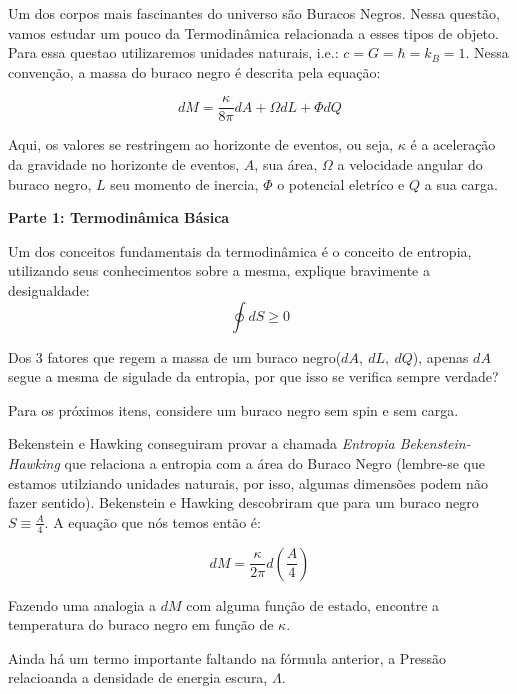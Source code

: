 \documentclass[11pt]{article}
\begin{document}
\begin{pproblem}
    Um dos corpos mais fascinantes do universo são Buracos Negros. Nessa questão, vamos estudar um pouco da Termodinâmica relacionada a esses tipos de objeto. Para essa questao utilizaremos unidades naturais, i.e.: \(c = G = \hbar = k_B = 1\). Nessa convenção, a massa do buraco negro é descrita pela equação:

    \[dM = \frac{\kappa}{8\pi}dA + \Omega dL + \Phi dQ\]

    Aqui, os valores se restringem ao horizonte de eventos, ou seja, \(\kappa\) é a aceleração da gravidade no horizonte de eventos, \(A\), sua área, \(\Omega\) a velocidade angular do buraco negro, \(L\) seu momento de inercia, \(\Phi\) o potencial eletríco e \(Q\) a sua carga.

    \begin{center}
    \textbf{Parte 1: Termodinâmica Básica}   
    \end{center}
    
    \begin{alternativas}
        \item Um dos conceitos fundamentais da termodinâmica é o conceito de entropia, utilizando seus conhecimentos sobre a mesma, explique bravimente a desigualdade:
        \[\oint dS \geq 0\]

        \item Dos 3 fatores que regem a massa de um buraco negro(\(dA, \ dL, \ dQ\)), apenas \(dA\) segue a mesma de sigulade da entropia, por que isso se verifica sempre verdade?
        
        Para os próximos itens, considere um buraco negro sem spin e sem carga.

        \item Bekenstein e Hawking conseguiram provar a chamada \textit{Entropia Bekenstein-Hawking} que relaciona a entropia com a área do Buraco Negro (lembre-se que estamos utilziando unidades naturais, por isso, algumas dimensões podem não fazer sentido). Bekenstein e Hawking descobriram que para um buraco negro \(S \equiv \frac{A}{4}\). A equação que nós temos então é:
        
        \[dM = \frac{\kappa}{2\pi}d\left(\frac{A}{4}\right)\]

        Fazendo uma analogia a \(dM\) com alguma função de estado, encontre a temperatura do buraco negro em função de \(\kappa\).

        Ainda há um termo importante faltando na fórmula anterior, a Pressão relacioanda a densidade de energia escura, \(\Lambda\).


\end{alternativas}
\end{pproblem}
\end{document}
